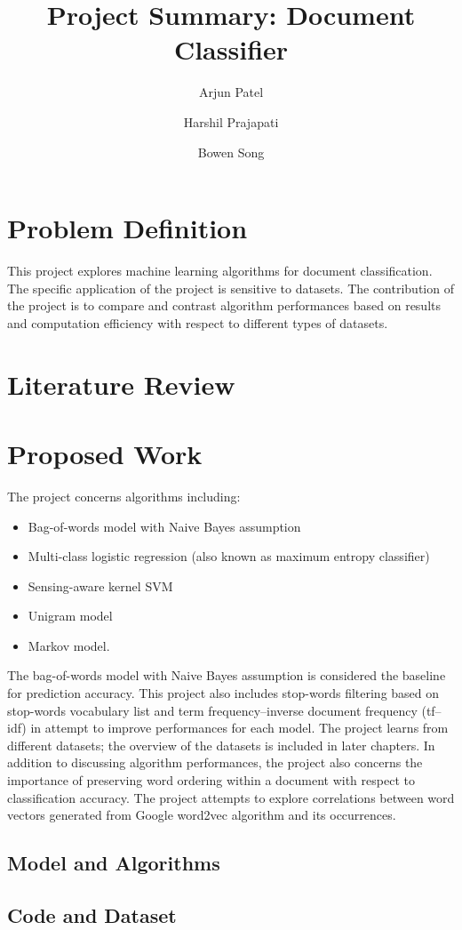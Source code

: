 \documentclass[a4paper, 11pt]{article}
\title{Project Summary: Document Classifier}
\author[1]{Arjun Patel}
\author[1]{Harshil Prajapati}
\author[1]{Bowen Song}
\affil[1]{Department of Electrical and Computer Engineering, Boston University}
\begin{document}
\maketitle
\section{Problem Definition}
This project explores machine learning algorithms for document classification. The specific application of the project is sensitive to datasets. The contribution of the project is to compare and contrast algorithm performances based on results and computation efficiency with respect to different types of datasets.
\section{Literature Review}
\section{Proposed Work}
The project concerns algorithms including:
\begin{itemize}
\item Bag-of-words model with Naive Bayes assumption
\item Multi-class logistic regression (also known as maximum entropy classifier)
\item Sensing-aware kernel SVM ~\cite{svm_2014}
\item Unigram model
\item Markov model.
\end{itemize}
The bag-of-words model with Naive Bayes assumption is considered the baseline for prediction accuracy. This project also includes stop-words filtering based on stop-words vocabulary list and term frequency–inverse document frequency (tf–idf) in attempt to improve performances for each model. The project learns from different datasets; the overview of the datasets is included in later chapters. In addition to discussing algorithm performances, the project also concerns the importance of preserving word ordering within a document with respect to classification accuracy. The project attempts to explore correlations between word vectors generated from Google word2vec algorithm and its occurrences. 
\subsection{Model and Algorithms}

\subsection{Code and Dataset}
\end{document}

